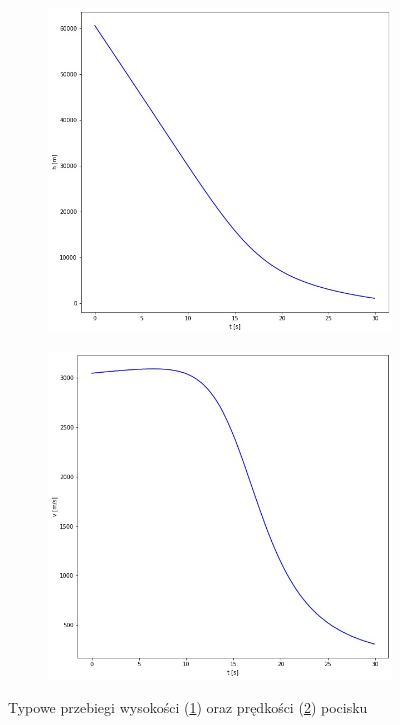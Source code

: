 \begin{figure}
	\centering
	\begin{subfigure}[b]{0.4\linewidth}
		\includegraphics[width=\linewidth]{ballistic_tracking_typical_h.jpg}
		\caption{}
		\label{fig:ballistic_typical_trajectories_h}
	\end{subfigure}
	\begin{subfigure}[b]{0.4\linewidth}
		\includegraphics[width=\linewidth]{ballistic_tracking_typical_v.jpg}
		\caption{}
		\label{fig:ballistic_typical_trajectories_v}
	\end{subfigure}
	\caption{Typowe przebiegi wysokości (\ref{fig:ballistic_typical_trajectories_h}) oraz prędkości (\ref{fig:ballistic_typical_trajectories_v}) pocisku}
	\label{fig:ballistic_typical_trajectories}
\end{figure}

